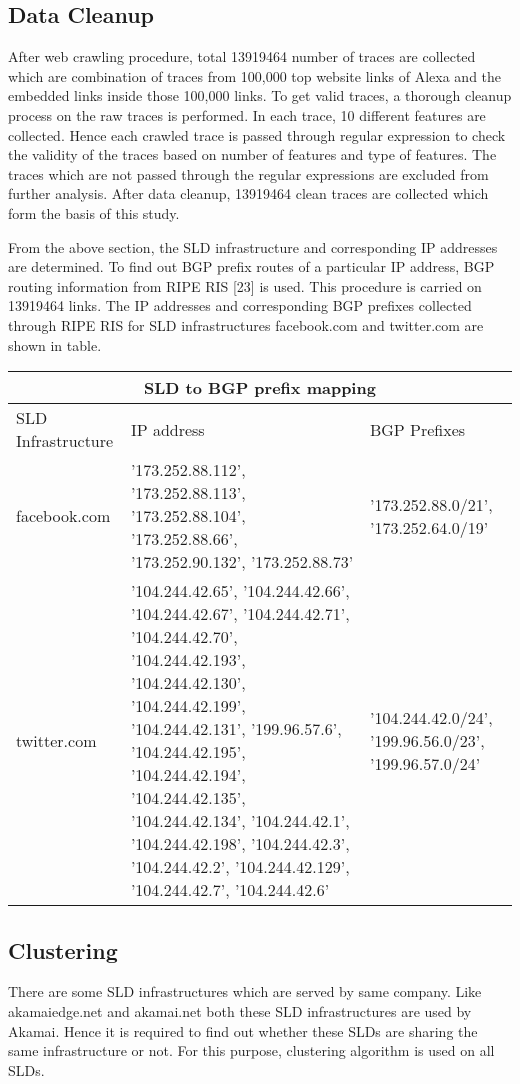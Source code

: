 \subsection{Data Cleanup}
After web crawling procedure, total 13919464 number of traces are collected which are combination of traces from 100,000 top website links of Alexa and the embedded links inside those 100,000 links. To get valid traces, a thorough cleanup process on the raw traces is performed. In each trace, 10 different features are collected. Hence each crawled trace is passed through regular expression to check the validity of the traces based on number of features and type of features. The traces which are not passed through the regular expressions are excluded from further analysis. After data cleanup, 13919464 clean traces are collected which form the basis of this study.

From the above section, the SLD infrastructure and corresponding IP addresses are determined. To find out BGP prefix routes of a particular IP address, BGP routing information from RIPE RIS [23] is used. This procedure is carried on 13919464 links. The IP addresses and corresponding BGP prefixes collected through RIPE RIS for SLD infrastructures facebook.com and twitter.com are shown in table.


\begin{tabular}{|p{3cm}||p{3cm}|p{3cm}| }
 \hline
 \multicolumn{3}{|c|}{SLD to BGP prefix mapping} \\
 \hline
 SLD Infrastructure     & IP address&BGP Prefixes\\
 \hline
 facebook.com   & '173.252.88.112', '173.252.88.113', '173.252.88.104', '173.252.88.66', '173.252.90.132', '173.252.88.73'    &'173.252.88.0/21', '173.252.64.0/19'\\
twitter.com&   '104.244.42.65', '104.244.42.66', '104.244.42.67', '104.244.42.71', '104.244.42.70', '104.244.42.193', '104.244.42.130', '104.244.42.199', '104.244.42.131', '199.96.57.6', '104.244.42.195', '104.244.42.194', '104.244.42.135', '104.244.42.134', '104.244.42.1', '104.244.42.198', '104.244.42.3', '104.244.42.2', '104.244.42.129', '104.244.42.7', '104.244.42.6'   &'104.244.42.0/24', '199.96.56.0/23', '199.96.57.0/24'\\
\hline
\end{tabular}
\newline

\subsection{Clustering}
There are some SLD infrastructures which are served by same company. Like akamaiedge.net and akamai.net both these SLD infrastructures are used by Akamai. Hence it is required to find out whether these SLDs are sharing the same infrastructure or not. For this purpose, clustering algorithm is used on all SLDs.

